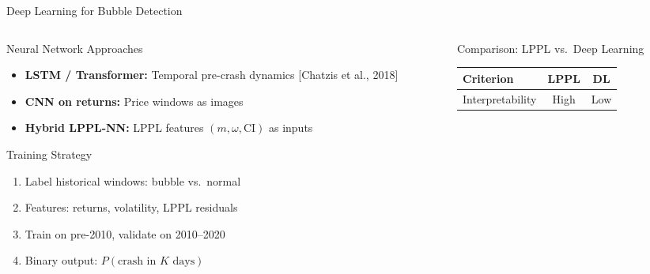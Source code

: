 \documentclass[9pt, aspectratio=169, t]{beamer}
\begin{document}
\begin{frame}{Deep Learning for Bubble Detection}
    \begin{cminipage}{0.95\textwidth}
    {\scriptsize
    \begin{columns}[T]
        \begin{column}{0.47\textwidth}
            \begin{block}{Neural Network Approaches}
                \begin{itemize}\setlength{\itemsep}{0pt}
                    \item \textbf{LSTM / Transformer:} Temporal pre-crash dynamics [Chatzis et al., 2018]
                    \item \textbf{CNN on returns:} Price windows as images
                    \item \textbf{Hybrid LPPL-NN:} LPPL features $(m, \omega, \text{CI})$ as inputs
                \end{itemize}
            \end{block}
            \vspace{-2mm}
            \begin{exampleblock}{Training Strategy}
                \begin{enumerate}\setlength{\itemsep}{0pt}
                    \item Label historical windows: bubble vs.\ normal
                    \item Features: returns, volatility, LPPL residuals
                    \item Train on pre-2010, validate on 2010--2020
                    \item Binary output: $P(\text{crash in } K \text{ days})$
                \end{enumerate}
            \end{exampleblock}
        \end{column}
        \begin{column}{0.47\textwidth}
            \begin{alertblock}{Comparison: LPPL vs.\ Deep Learning}
                {\scriptsize
                \begin{center}
                    \begin{tabular}{lcc}
                        \toprule
                        \textbf{Criterion} & \textbf{LPPL} & \textbf{DL} \\
                        \midrule
                        Interpretability & High & Low \\

\end{tabular}
\end{center}}
\end{alertblock}
\end{column}
\end{columns}}
\end{cminipage}
\end{frame}
\end{document}
